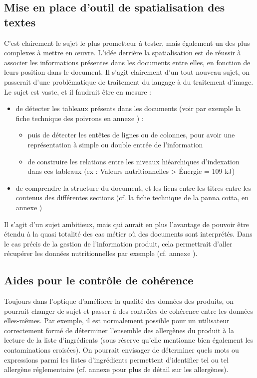    \subsection{Mise en place d'outil de spatialisation des textes}
    
    C'est clairement le sujet le plus prometteur à tester, mais également un des plus complexes à mettre en \oe uvre.
    L'idée derrière la spatialisation est de réussir à associer les informations présentes dans les documents entre elles, en fonction de leurs position dans le document.
    Il s'agit clairement d'un tout nouveau sujet, on passerait d'une problématique de traitement du langage à du traitement d'image.
    Le sujet est vaste, et il faudrait être en mesure : 
    \begin{itemize}
        \item de détecter les tableaux présents dans les documents (voir par exemple la fiche technique des poivrons en annexe ) : 
        \begin{itemize}
            \item puis de détecter les entêtes de lignes ou de colonnes, pour avoir une représentation à simple ou double entrée de l'information
            \item de construire les relations entre les niveaux hiéarchiques d'indexation dans ces tableaux (ex : Valeurs nutritionnelles > \'{E}nergie = 109 kJ)
        \end{itemize}
        \item de comprendre la structure du document, et les liens entre les titres entre les contenus des différentes sections (cf. la fiche technique de la panna cotta, en annexe )
    \end{itemize}
    Il s'agit d'un sujet ambitieux, mais qui aurait en plus l'avantage de pouvoir être étendu à la quasi totalité des cas métier où des documents sont interprétés.
    Dans le cas précis de la gestion de l'information produit, cela permettrait d'aller récupérer les données nutritionnelles par exemple (cf. annexe ).

    \subsection{Aides pour le contrôle de cohérence}
    
    Toujours dans l'optique d'améliorer la qualité des données des produits, on pourrait changer de sujet et passer à des contrôles de cohérence entre les données elles-mêmes.
    Par exemple, il est normalement possible pour un utilisateur correctement formé de déterminer l'ensemble des allergènes du produit à la lecture de la liste d'ingrédients (sous réserve qu'elle mentionne bien également les contaminations croisées).
    On pourrait envisager de déterminer quels mots ou expressions parmi les listes d'ingrédients permettent d'identifier tel ou tel allergène réglementaire (cf. annexe  pour plus de détail sur les allergènes).

